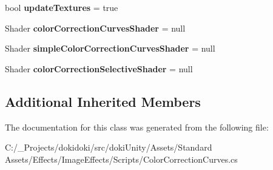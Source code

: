 \begin{DoxyCompactItemize}
\item 
bool {\bfseries update\+Textures} = true\hypertarget{class_unity_standard_assets_1_1_image_effects_1_1_color_correction_curves_a884bb1061e32d3a5fab4d0c8441d94d8}{}\label{class_unity_standard_assets_1_1_image_effects_1_1_color_correction_curves_a884bb1061e32d3a5fab4d0c8441d94d8}

\item 
Shader {\bfseries color\+Correction\+Curves\+Shader} = null\hypertarget{class_unity_standard_assets_1_1_image_effects_1_1_color_correction_curves_aef2fd5672e6e767d72f3403935b747de}{}\label{class_unity_standard_assets_1_1_image_effects_1_1_color_correction_curves_aef2fd5672e6e767d72f3403935b747de}

\item 
Shader {\bfseries simple\+Color\+Correction\+Curves\+Shader} = null\hypertarget{class_unity_standard_assets_1_1_image_effects_1_1_color_correction_curves_a9adea1c6642389514702ad46e870085a}{}\label{class_unity_standard_assets_1_1_image_effects_1_1_color_correction_curves_a9adea1c6642389514702ad46e870085a}

\item 
Shader {\bfseries color\+Correction\+Selective\+Shader} = null\hypertarget{class_unity_standard_assets_1_1_image_effects_1_1_color_correction_curves_a8ca932711d39b00d7ace42d6f416e1d7}{}\label{class_unity_standard_assets_1_1_image_effects_1_1_color_correction_curves_a8ca932711d39b00d7ace42d6f416e1d7}

\end{DoxyCompactItemize}
\subsection*{Additional Inherited Members}


The documentation for this class was generated from the following file\+:\begin{DoxyCompactItemize}
\item 
C\+:/\+\_\+\+Projects/dokidoki/src/doki\+Unity/\+Assets/\+Standard Assets/\+Effects/\+Image\+Effects/\+Scripts/Color\+Correction\+Curves.\+cs\end{DoxyCompactItemize}
